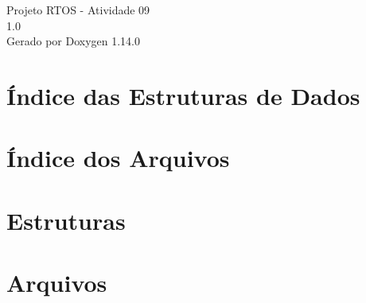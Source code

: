 \documentclass[twoside]{book}
\newcommand{\+}{\discretionary{\mbox{\scriptsize$\hookleftarrow$}}{}{}}
\newcommand{\clearemptydoublepage}{%
    \newpage{\pagestyle{empty}\cleardoublepage}%
  }
\begin{document}
  \raggedbottom
    \hypersetup{pageanchor=false,
                bookmarksnumbered=true,
                pdfencoding=unicode
               }
  \begin{titlepage}
  \vspace*{7cm}
  \begin{center}%
  {\Large Projeto RTOS -\/ Atividade 09}\\
  [1ex]\large 1.\+0 \\
  \vspace*{1cm}
  {\large Gerado por Doxygen 1.14.0}\\
  \end{center}
  \end{titlepage}
  \clearemptydoublepage
  \tableofcontents
  \clearemptydoublepage
  \hypersetup{pageanchor=true}
\chapter{Índice das Estruturas de Dados}

\chapter{Índice dos Arquivos}

\chapter{Estruturas}


\chapter{Arquivos}



















  \backmatter
  \newpage
  \clearemptydoublepage
  \printindex
\end{document}
